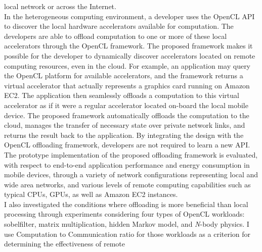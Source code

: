 local network or across the Internet.\\
%
In the heterogeneous computing environment, a developer uses the OpenCL
API to discover the local hardware accelerators available for
computation.
%
The developers are able to offload computation to one or more of these
local accelerators through the OpenCL framework.
%
The proposed framework makes it possible for the developer to
dynamically discover accelerators located on remote computing resources,
even in the cloud.
%
For example, an application may query the OpenCL platform for available
accelerators, and the framework returns a virtual accelerator that
actually represents a graphics card running on Amazon EC2.
%
The application then seamlessly offloads a computation to this virtual
accelerator as if it were a regular accelerator located on-board
the local mobile device.
%
The proposed framework automatically offloads the computation to the
cloud, manages the transfer of necessary state over private network
links, and returns the result back to the application.
%
By integrating the design with the OpenCL offloading framework,
developers are not required to learn a new API.
%
The prototype implementation of the proposed offloading framework is evaluated,
with respect to end-to-end application performance and energy
consumption in mobile devices, through a variety of network
configurations representing local and wide area networks, and various
levels of remote computing capabilities such as typical CPUs, GPUs, as
well as Amazon EC2 instances.\\
%
%
%
%
%
I also investigated the conditions where offloading is more beneficial
than local processing through experiments considering four types of OpenCL workloads:
sobelfilter, matrix multiplication, hidden Markov model, and {\it N}-body
physics. 
%
I use Computation to Communication ratio for those
workloads as a criterion for determining the effectiveness of remote
